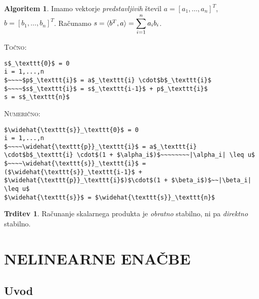 \documentclass[11pt]{article}
\theoremstyle{definition}
\newtheorem{trditev}{Trditev}
\newtheorem*{algoritem}{Algoritem}
\begin{document}
\begin{algoritem}

Imamo vektorje \textit{predstavljivih} števil $a = [a_1, \dots, a_n]^T$, $b = [b_1, \dots, b_n]^T$. Računamo $s = \langle b^T, a \rangle = \mathlarger{\sum_{i=1}^n a_i b_i}$.

\noindent \textsc{Točno}:
\begin{lstlisting}
s$_\texttt{0}$ = 0
i = 1,...,n
$~~~~$p$_\texttt{i}$ = a$_\texttt{i} \cdot$b$_\texttt{i}$
$~~~~$s$_\texttt{i}$ = s$_\texttt{i-1}$ + p$_\texttt{i}$
s = s$_\texttt{n}$
\end{lstlisting}

\noindent \textsc{Numerično}:
\begin{lstlisting}
$\widehat{\texttt{s}}_\texttt{0}$ = 0
i = 1,...,n
$~~~~\widehat{\texttt{p}}_\texttt{i}$ = a$_\texttt{i} \cdot$b$_\texttt{i} \cdot$(1 + $\alpha_i$)$~~~~~~~~|\alpha_i| \leq u$
$~~~~\widehat{\texttt{s}}_\texttt{i}$ = ($\widehat{\texttt{s}}_\texttt{i-1}$ + $\widehat{\texttt{p}}_\texttt{i}$)$\cdot$(1 + $\beta_i$)$~~|\beta_i| \leq u$
$\widehat{\texttt{s}}$ = $\widehat{\texttt{s}}_\texttt{n}$
\end{lstlisting}

\end{algoritem}
\vspace{0.5cm}

\begin{trditev}

Računanje skalarnega produkta je \textit{obratno} stabilno, ni pa \textit{direktno} stabilno.

\end{trditev}
\vspace{0.5cm}


\pagebreak


\section{NELINEARNE ENAČBE}
\vspace{0.5cm}


\subsection{Uvod}
\vspace{0.5cm}
\end{document}

